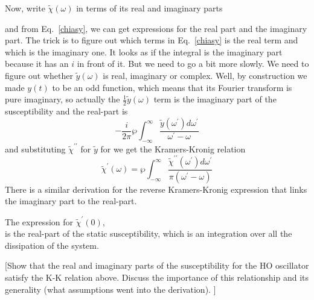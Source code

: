 \documentclass[]{revtex4}
\newcommand{\sm}[1]{{\[#1\]}}
\begin{document}
Now, write $\tilde{\chi}{(\omega)}$ in terms of its real and imaginary parts
\sm{}

and from Eq.~\ref{chiasy}, we can get expressions for the real part and the imaginary part.  The trick is to figure out which terms in Eq.~\ref{chiasy}
is the real term and which is the imaginary one.  It looks as if the integral is the imaginary part because it has an $i$ in front of it.  But we need
to go a bit more slowly.  We need to figure out whether $\tilde{y}(\omega)$ is real, imaginary or complex.  Well, by construction we made $y(t)$ to be an
odd function, which means that its Fourier transform is pure imaginary, so actually the $\frac{1}{2}\tilde{y}(\omega)$ term is the imaginary part of the
susceptibility and the real-part is
\sm{-\frac{i}{2\pi}\wp\int_{-\infty}^\infty \frac{\tilde{y}(\omega^\prime)d\omega^\prime}{\omega^\prime-\omega}}
and substituting $\tilde{\chi}^{\prime\prime}$ for $\tilde{y}$ for we get the Kramers-Kronig relation
\sm{\tilde{\chi}^\prime(\omega) = \wp\int_{-\infty}^\infty\frac{{\tilde{\chi}^{\prime\prime}(\omega^\prime)d\omega^\prime}}{\pi(\omega^\prime-\omega)}}
There is a similar derivation for the reverse Kramers-Kronig expression that links the imaginary part to the real-part.

The expression for $\tilde{\chi}^\prime(0)$,
\sm{}
is the real-part of the static susceptibility, which is an integration over all the dissipation of the system.

      [Show that the real and imaginary parts
            of the susceptibility for the HO oscillator satisfy the K-K relation above.
            Discuss the importance of this relationship and its generality (what assumptions went into the derivation).  ]
\end{document}

